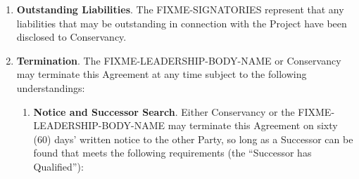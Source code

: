 \documentclass[letterpaper,12pt]{article}
\newcommand{\signatories}{FIXME-SIGNATORIES\xspace}
\newcommand{\leadershipbody}{FIXME-LEADERSHIP-BODY-NAME\xspace}
\begin{document}
\begin{enumerate}[label=\arabic*.,ref=\S~\arabic*]
\begin{itemize}
The positions on the Committee will be on a two-year staggered basis 
([FIX-ME: some portion] of the initial board seats will be for one year).  
The members of the Committee may be removed from the position at any time 
by a majority vote of the Community Members.  Upon the resignation or 
removal of a member of the Oversight Board, the Community Members shall 
elect a replacement Community Member to serve on the Committee. 

The Committee will elect a single individual to communicate with 
Conservancy (the ``Representative'') and shall notify Conservancy promptly 
following the election of a new Representative.  The Representative will 
have the authority to instruct Conservancy on the Project's behalf on all
matters.  

This section may be modified by a vote of at least $\frac{3}{4}$ths of the 
Community Members, with the consent of Conservancy, such consent not to be 
unreasonably withheld.


\end{itemize}

Note again that the above are merely examples, not a list of options.
Conservancy's goal is to draft the Representation section to match
the existing and natural leadership structure of the Project, so each
project usually has a uniquely worded Representation section. ]

\item \textbf{Outstanding Liabilities}. The \signatories represent
that any liabilities that may be outstanding in connection with the
Project have been disclosed to Conservancy. 
\item \textbf{Termination}. \label{Termination} The \leadershipbody or Conservancy
may terminate this Agreement at any time subject to the following
understandings:


\begin{enumerate}[label=\alph*.,ref=\theenumi(\arabic*)]

\item \textbf{Notice and Successor Search}. Either Conservancy or the \leadershipbody
may terminate this Agreement on sixty (60) days' written notice to
the other Party, so long as a Successor can be found that meets the
following requirements (the ``Successor has Qualified''):



\end{enumerate}
\end{enumerate}
\end{document}
